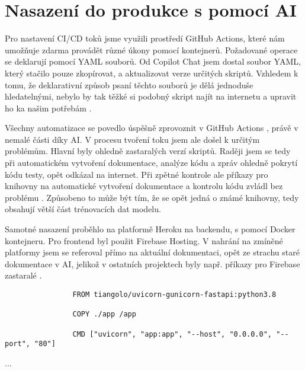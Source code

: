 \documentclass[FM,DP]{tulthesis}
\begin{document}
		
		\section{Nasazení do produkce s pomocí AI}
		
		Pro nastavení CI/CD toků jsme využili prostředí GitHub Actions, které nám umožňuje zdarma provádět různé úkony pomocí kontejnerů. Požadované operace se deklarují pomocí YAML souborů. Od Copilot Chat jsem dostal soubor YAML, který stačilo pouze zkopírovat, a aktualizovat verze určitých skriptů. Vzhledem k tomu, že deklarativní způsob psaní těchto souborů je dělá jednoduše hledatelnými, nebylo by tak těžké si podobný skript najít na internetu a upravit ho ka našim potřebám \cite{ibm:containers} \cite{docker}.
		
		Všechny automatizace se povedlo úspěšně zprovoznit v GitHub Actions \cite{GHA} \cite{cicd_t}, právě v nemalé části díky AI. V procesu tvoření toku jsem ale došel k určitým problémům. Hlavní byly ohledně zastaralých verzí skriptů. Raději jsem se tedy při automatickém vytvoření dokumentace, analýze kódu a zpráv ohledně pokrytí kódu testy, opět odkázal na internet. Při zpětné kontrole ale příkazy pro knihovny na automatické vytvoření dokumentace a kontrolu kódu zvládl bez problému \cite{codecov} \cite{static_ana}. Způsobeno to může být tím, že se opět jedná o známé knihovny, tedy obsahují větší část trénovacích dat modelu.
		
		Samotné nasazení proběhlo na platformě Heroku na backendu, s pomocí Docker kontejneru. Pro frontend byl použit Firebase Hosting. V nahrání na zmíněné platformy jsem se referoval přímo na aktuální dokumentaci, opět ze strachu staré dokumentace v AI, jelikož v ostatních projektech byly např. příkazy pro Firebase zastaralé \cite{firebase} \cite{docker} \cite{Heroku} \cite{ibm:containers} \cite{cors}.
		
		\vspace{0.6em}
		\begin{tcolorbox}[colback=white,colframe=black,title=Soubor pro spuštení docker kontejneru]
			\begin{lstlisting}
				FROM tiangolo/uvicorn-gunicorn-fastapi:python3.8
				
				COPY ./app /app
				
				CMD ["uvicorn", "app:app", "--host", "0.0.0.0", "--port", "80"]
			\end{lstlisting}
			... \cite{agent_deploy}
		\end{tcolorbox}
		\vspace{0.6em}
		
\end{document}
